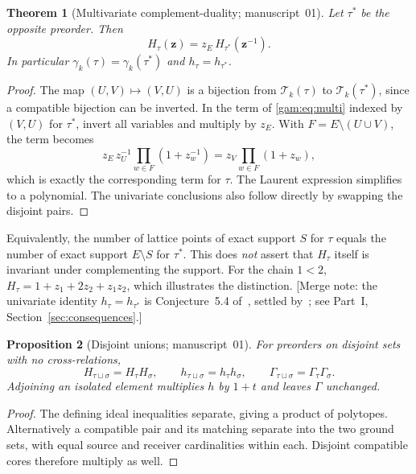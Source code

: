 \documentclass[11pt]{article}
\numberwithin{equation}{section}
\newtheorem{theorem}{Theorem}[section]
\newtheorem{proposition}[theorem]{Proposition}
\theoremstyle{definition}
\newcommand{\zv}{\mathbf z}
\newcommand{\Tset}{\mathcal T}
\begin{document}
\begin{theorem}[Multivariate complement-duality; manuscript~01]\label{gam:gv:thm:duality}
Let $\tau^*$ be the opposite preorder. Then
\begin{equation}
 H_\tau(\zv)=z_E\, H_{\tau^*}(\zv^{-1}).
 \label{gam:gv:eq:duality}
\end{equation}
In particular $\gamma_k(\tau)=\gamma_k(\tau^*)$ and $h_\tau=h_{\tau^*}$.
\end{theorem}
\begin{proof}
The map $(U,V)\mapsto(V,U)$ is a bijection from
$\Tset_k(\tau)$ to $\Tset_k(\tau^*)$, since a compatible bijection
can be inverted. In the term of \eqref{gam:eq:multi} indexed by $(V,U)$ for
$\tau^*$, invert all variables and multiply by $z_E$. With
$F=E\setminus(U\cup V)$, the term becomes
\[
 z_E\,z_U^{-1}\prod_{w\in F}(1+z_w^{-1})
   =z_V\prod_{w\in F}(1+z_w),
\]
which is exactly the corresponding term for $\tau$. The Laurent expression
simplifies to a polynomial. The univariate conclusions also follow directly
by swapping the disjoint pairs.
\end{proof}
Equivalently, the number of lattice points of exact support $S$ for $\tau$
equals the number of exact support $E\setminus S$ for $\tau^*$. This does
\emph{not} assert that $H_\tau$ itself is invariant under complementing the
support. For the chain $1<2$,
$H_\tau=1+z_1+2z_2+z_1z_2$, which illustrates the distinction. [Merge note:
the univariate identity $h_\tau=h_{\tau^*}$ is Conjecture~5.4 of~\cite{AC},
settled by~\cite[Theorem~1.3]{DHLTW}; see Part~I,
Section~\ref{sec:consequences}.]

\begin{proposition}[Disjoint unions; manuscript~01]\label{gam:gv:prop:products}
For preorders on disjoint sets with no cross-relations,
\[
 H_{\tau\sqcup\sigma}=H_\tau H_\sigma,\qquad
 h_{\tau\sqcup\sigma}=h_\tau h_\sigma,\qquad
 \Gamma_{\tau\sqcup\sigma}=\Gamma_\tau\Gamma_\sigma.
\]
Adjoining an isolated element multiplies $h$ by $1+t$ and leaves
$\Gamma$ unchanged.
\end{proposition}
\begin{proof}
The defining ideal inequalities separate, giving a product of polytopes.
Alternatively a compatible pair and its matching separate into the two
ground sets, with equal source and receiver cardinalities within each.
Disjoint compatible cores therefore multiply as well.
\end{proof}
\end{document}
